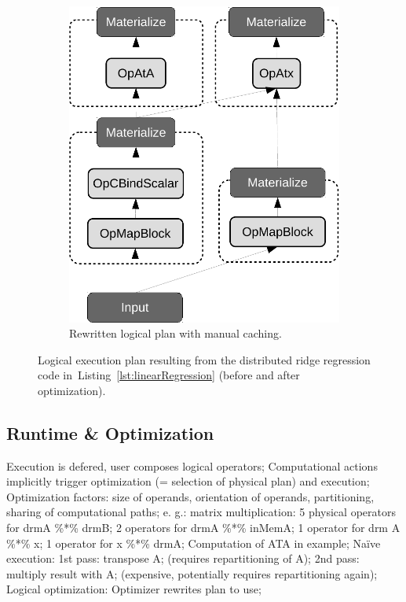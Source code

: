 \documentclass{article}
\begin{document}
\begin{figure}
\begin{subfigure}[b]{0.25\textwidth}
            \includegraphics[scale=.25]{figures/linear-regression-logicalplan-optimized-caching-crop}
            \caption{Rewritten logical plan with manual caching.}
            \label{fig:logicalplan-optimized-caching}
        \end{subfigure}  
        \caption{\label{fig:logicalplans} Logical execution plan resulting from the distributed ridge regression code in~Listing~\ref{lst:linearRegression} (before and after optimization).}
\end{figure}


\subsection{Runtime \& Optimization}\label{sec:optimization}

Execution is defered, user composes logical operators; Computational actions implicitly trigger optimization (= selection of physical plan) and execution; Optimization factors:  size of operands, orientation of operands, partitioning, sharing of computational paths; e. g.: matrix multiplication: 5 physical operators for drmA \%*\% drmB; 2 operators for drmA \%*\% inMemA; 1 operator for drm A \%*\% x; 1 operator for x \%*\% drmA; Computation of ATA in example; Naïve execution: 1st  pass: transpose A; (requires repartitioning of A); 2nd pass: multiply result with A; (expensive, potentially requires repartitioning again); Logical optimization: Optimizer rewrites plan to use; 
\end{document}
